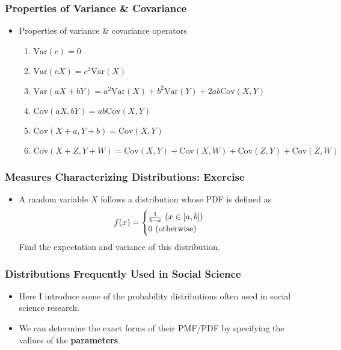 \documentclass[pdflatex, 12pt]{beamer}
\begin{document}
\begin{frame}
\frametitle{Properties of Variance \& Covariance}
\begin{itemize}
\item Properties of variance \& covariance operators
 \begin{enumerate}
 \item $\mathrm{Var}(c) = 0$
 \item $\mathrm{Var}(cX) = c^2\mathrm{Var}(X)$
 \item $\mathrm{Var}(aX + bY) = a^2\mathrm{Var}(X) + b^2\mathrm{Var}(Y) + 2ab\mathrm{Cov}(X, Y)$
 \item $\mathrm{Cov}(aX, bY) = ab\mathrm{Cov}(X, Y)$
 \item $\mathrm{Cov}(X + a, Y + b) = \mathrm{Cov}(X, Y)$
 \item $\mathrm{Cov}(X + Z, Y + W) = \mathrm{Cov}(X, Y) + \mathrm{Cov}(X, W) + \mathrm{Cov}(Z, Y) + \mathrm{Cov}(Z, W)$
 \end{enumerate}
\end{itemize}
\end{frame}

\begin{frame}
\frametitle{Measures Characterizing Distributions: Exercise}
\begin{itemize}
\item A random variable $X$ follows a distribution whose PDF is defined as
 \begin{equation}
 f(x) = 
 \begin{cases}
 \frac{1}{b- a} \ (x \in [a, b]) \\
 0 \ (\mathrm{otherwise})
 \end{cases} \notag
 \end{equation}
Find the expectation and variance of this distribution.
\end{itemize}
\end{frame}

\begin{frame}
\frametitle{Distributions Frequently Used in Social Science}
\begin{itemize}
\item Here I introduce some of the probability distributions often used in social science research.
\vspace{0.4cm}
\item We can determine the exact forms of their PMF/PDF by specifying the vallues of the \textbf{parameters}.
\end{itemize}
\end{frame}
\end{document}
